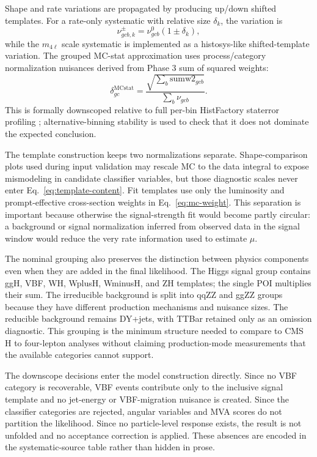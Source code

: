 \documentclass[11pt]{article}
\begin{document}
Shape and rate variations are propagated by producing up/down shifted templates. For a rate-only systematic with relative size $\delta_k$, the variation is
\begin{equation}
 \nu^{\pm}_{gcb,k}=\nu^{0}_{gcb}(1\pm\delta_k),
 \label{eq:rate-syst}
\end{equation}
while the $m_{4\ell}$ scale systematic is implemented as a histosys-like shifted-template variation. The grouped MC-stat approximation uses process/category normalization nuisances derived from Phase 3 sum of squared weights:
\begin{equation}
 \delta^{\mathrm{MCstat}}_{gc}=\frac{\sqrt{\sum_b \mathrm{sumw2}_{gcb}}}{\sum_b \nu_{gcb}}.
 \label{eq:mcstat-grouped}
\end{equation}
This is formally downscoped relative to full per-bin HistFactory staterror profiling \cite{HistFactory}; alternative-binning stability is used to check that it does not dominate the expected conclusion.

The template construction keeps two normalizations separate. Shape-comparison plots used during input validation may rescale MC to the data integral to expose mismodeling in candidate classifier variables, but those diagnostic scales never enter Eq.~\ref{eq:template-content}. Fit templates use only the luminosity and prompt-effective cross-section weights in Eq.~\ref{eq:mc-weight}. This separation is important because otherwise the signal-strength fit would become partly circular: a background or signal normalization inferred from observed data in the signal window would reduce the very rate information used to estimate $\mu$.

The nominal grouping also preserves the distinction between physics components even when they are added in the final likelihood. The Higgs signal group contains ggH, VBF, WH, WplusH, WminusH, and ZH templates; the single POI multiplies their sum. The irreducible background is split into qqZZ and ggZZ groups because they have different production mechanisms and nuisance sizes. The reducible background remains DY+jets, with TTBar retained only as an omission diagnostic. This grouping is the minimum structure needed to compare to CMS H to four-lepton analyses without claiming production-mode measurements that the available categories cannot support.

The downscope decisions enter the model construction directly. Since no VBF category is recoverable, VBF events contribute only to the inclusive signal template and no jet-energy or VBF-migration nuisance is created. Since the classifier categories are rejected, angular variables and MVA scores do not partition the likelihood. Since no particle-level response exists, the result is not unfolded and no acceptance correction is applied. These absences are encoded in the systematic-source table rather than hidden in prose.
\end{document}
